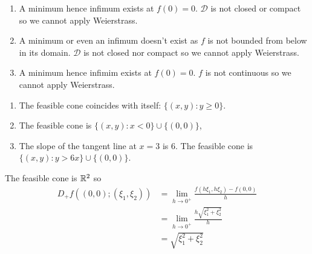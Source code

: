 \documentclass[12pt]{article}
\begin{document}
\begin{problem}[3]
\begin{enumerate}[label=(\roman*)]
	\item A minimum hence infimum exists at $ f(0) = 0$. $ \mathcal{ D}$ is not closed or compact so we cannot apply Weierstrass.
	\item A minimum or even an infimum doesn't exist as $ f$ is not bounded from below in its domain. $ \mathcal{ D}$ is not closed nor compact so we cannot apply Weierstrass.
	\item  A minimum hence infimim exists at $ f(0) = 0$. $ f$ is not continuous so we cannot apply Weierstrass.
\end{enumerate}
\end{problem}

\begin{problem}[4]
\begin{enumerate}[label=(\roman*)]
	\item The feasible cone coincides with itself: $ \{(x,y):y \geq 0\} $.
	\item The feasible cone is $ \{(x,y):x < 0\} \cup \{(0,0)\}$,
	\item The slope of the tangent line at $ x=3$ is 6. The feasible cone is $ \{(x,y): y > 6x\} \cup \{(0,0)\}  $.
\end{enumerate}
\end{problem}

\begin{problem}[5]
The feasible cone is $ \mathbb{R}^2$ so
\begin{align*}
	D_+f((0,0);(\xi_1,\xi_2)) &= \lim_{ h \to 0^+} \frac{f(h\xi_1,h\xi_2) - f(0,0)}{ h} \\
	&=\lim_{ h \to 0^+} \frac{h \sqrt{\xi_1^2+\xi_2^2} }{ h}   \\
	&=\sqrt{ \xi_1^2+ \xi_2^2}  
\end{align*}
\end{problem}
\end{document}
